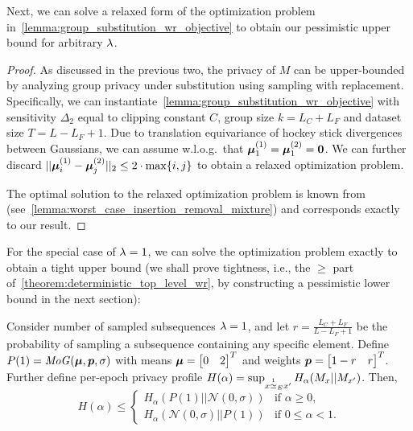 Next, we can solve a relaxed form of the optimization problem in~\cref{lemma:group_substitution_wr_objective} to obtain our pessimistic upper bound for arbitrary $\lambda$.
\deterministictoplevelwrgeneral*
\begin{proof}
    As discussed in the previous two, the privacy of $M$ can be upper-bounded by
    analyzing group privacy under substitution using sampling with replacement.
    Specifically, we can instantiate~\cref{lemma:group_substitution_wr_objective} with sensitivity $\Delta_2$ equal to clipping constant $C$,
    group size $k = L_C + L_F$ and dataset size $T = L - L_F + 1$.
    Due to translation equivariance of hockey stick divergences between Gaussians, we can assume w.l.o.g.\
    that ${\bm{\mu}}^{(1)}_1 = {\bm{\mu}}^{(2)}_1 = {\bm{0}}$.
    We can further discard $||{\bm{\mu}}^{(1)}_i - {\bm{\mu}}^{(2)}_j||_2 \leq 2 \cdot \max \{ i, j \}$ to obtain a relaxed optimization problem.
    
    The optimal solution to the relaxed optimization problem is known from~\cite{schuchardt2024unified} (see~\cref{lemma:worst_case_insertion_removal_mixture}) and corresponds exactly to our result.
\end{proof}
For the special case of $\lambda = 1$, we can solve the optimization problem exactly to obtain a tight upper bound
(we shall prove tightness, i.e.,  the $\geq$ part of~\cref{theorem:deterministic_top_level_wr}, by constructing a pessimistic lower bound in the next section):
\begin{lemma}\label{theorem:deterministic_top_level_wr_leq_half}
    Consider number of sampled subsequences $\lambda = 1$,
    and let $r = \frac{L_C + L_F}{L - L_F + 1}$ be the probability of sampling a subsequence containing any specific element.
    Define
    $P(1) = \mathit{MoG}({\bm{\mu}}, {\bm{p}}, \sigma)$ with
    means ${\bm{\mu}} = \begin{bmatrix}
        0 & 2
    \end{bmatrix}^T$ and 
    weights ${\bm{p}} = \begin{bmatrix} 1-r & r\end{bmatrix}^T$. Further define per-epoch privacy profile $H(\alpha) = \sup_{x \overset{1}{\simeq}_{E} x'} H_\alpha(M_x || M_{x'})$. Then, 
    \begin{equation*}
        H(\alpha) \leq 
        \begin{cases}
            H_\alpha(P(1) || \mathcal{N}(0,\sigma)) & \text{if } \alpha \geq 0,\\
            H_\alpha(\mathcal{N}(0,\sigma) || P(1)) & \text{if } 0 \leq \alpha < 1.
        \end{cases}
    \end{equation*}
\end{lemma}
